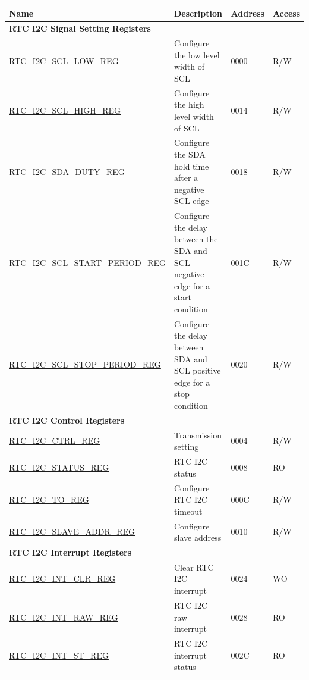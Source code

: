\begin{longtable}{ | p{6cm} | p{7.2cm} | p{1.3cm} | p{1cm} | }
\hline\rowcolor{lightgray}
Name & Description &  Address & Access \\ \hline
\endhead
\multicolumn{4}{|l|}{\textbf{RTC I2C Signal Setting Registers}} \\ \hline
\hyperref[regdesc:RTCI2CSCLLOWREG]{RTC\_I2C\_SCL\_LOW\_REG} & Configure the low level width of SCL & \hexprefix{}0000 & R/W \\ \hline
\hyperref[regdesc:RTCI2CSCLHIGHREG]{RTC\_I2C\_SCL\_HIGH\_REG} & Configure the high level width of SCL & \hexprefix{}0014 & R/W \\ \hline
\hyperref[regdesc:RTCI2CSDADUTYREG]{RTC\_I2C\_SDA\_DUTY\_REG} & Configure the SDA hold time after a negative SCL edge & \hexprefix{}0018 & R/W \\ \hline
\hyperref[regdesc:RTCI2CSCLSTARTPERIODREG]{RTC\_I2C\_SCL\_START\_PERIOD\_REG} & Configure the delay between the SDA and SCL negative edge for a start condition & \hexprefix{}001C & R/W \\ \hline
\hyperref[regdesc:RTCI2CSCLSTOPPERIODREG]{RTC\_I2C\_SCL\_STOP\_PERIOD\_REG} & Configure the delay between SDA and SCL positive edge for a stop condition & \hexprefix{}0020 & R/W \\ \hline
\multicolumn{4}{|l|}{\textbf{RTC I2C Control Registers}} \\ \hline
\hyperref[regdesc:RTCI2CCTRLREG]{RTC\_I2C\_CTRL\_REG} & Transmission setting & \hexprefix{}0004 & R/W \\ \hline
\hyperref[regdesc:RTCI2CSTATUSREG]{RTC\_I2C\_STATUS\_REG} & RTC I2C status & \hexprefix{}0008 & RO \\ \hline
\hyperref[regdesc:RTCI2CTOREG]{RTC\_I2C\_TO\_REG} & Configure RTC I2C timeout & \hexprefix{}000C & R/W \\ \hline
\hyperref[regdesc:RTCI2CSLAVEADDRREG]{RTC\_I2C\_SLAVE\_ADDR\_REG} & Configure slave address & \hexprefix{}0010 & R/W \\ \hline
\multicolumn{4}{|l|}{\textbf{RTC I2C Interrupt Registers}} \\ \hline
\hyperref[regdesc:RTCI2CINTCLRREG]{RTC\_I2C\_INT\_CLR\_REG} & Clear RTC I2C interrupt & \hexprefix{}0024 & WO \\ \hline
\hyperref[regdesc:RTCI2CINTRAWREG]{RTC\_I2C\_INT\_RAW\_REG} & RTC I2C raw interrupt & \hexprefix{}0028 & RO \\ \hline
\hyperref[regdesc:RTCI2CINTSTREG]{RTC\_I2C\_INT\_ST\_REG} & RTC I2C interrupt status & \hexprefix{}002C & RO \\ \hline

\end{longtable}
